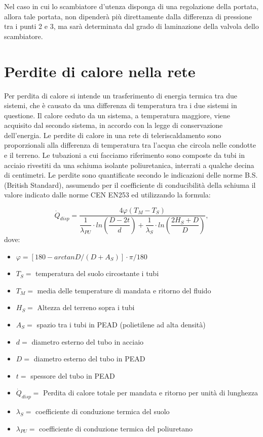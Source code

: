 \documentclass[laurea,oneside,11pt]{USiena_tesiLM3}
\begin{document}
Nel caso in cui lo scambiatore d'utenza disponga di una regolazione della portata, allora tale portata, non dipenderà più direttamente dalla differenza di pressione tra i punti 2 e 3, ma sarà determinata dal grado di laminazione della valvola dello scambiatore. 

\section{Perdite di calore nella rete}
Per perdita di calore si intende un trasferimento di 
energia termica tra due sistemi, che è causato da una differenza di temperatura tra i due sistemi in questione. Il calore ceduto da un sistema, a temperatura maggiore, viene acquisito dal secondo sistema, in accordo con la legge di conservazione dell'energia. 
Le perdite di calore in una rete di teleriscaldamento sono proporzionali alla differenza di temperatura tra l'acqua che circola nelle condotte e il terreno. Le tubazioni a cui facciamo riferimento sono composte da tubi in acciaio rivestiti da una schiuma isolante poliuretanica, interrati a qualche decina di centimetri.
Le perdite sono quantificate secondo le indicazioni delle norme B.S. (British Standard), assumendo per il coefficiente di conducibilità della schiuma il valore indicato dalle norme CEN EN253 ed utilizzando la formula:

\begin{equation}
\dot{Q}_{disp} = \dfrac{4 \varphi (T_M - T_S)}{\dfrac{1}{\lambda_{PU}} \cdot ln \left(  \dfrac{D - 2t}{d}\right)  + \dfrac{1}{\lambda_S} \cdot ln \left(  \dfrac{2H_S + D}{D}\right) } ,
\end{equation}
dove:
\begin{itemize}
\item[] $\varphi = \left[ 180 - arctan  D /( D + A_S)  \right] \cdot \pi/180 $  
\item[] $T_S =$ temperatura del suolo circostante i tubi
\item[] $T_M =$ media delle temperature di mandata e ritorno del fluido
\item[] $H_S =$ Altezza del terreno sopra i tubi
\item[] $A_S =$ spazio tra i tubi in PEAD (polietilene ad alta densità)
\item[] $d =$ diametro esterno del tubo in acciaio
\item[] $D =$ diametro esterno del tubo in PEAD
\item[] $t =$ spessore del tubo in PEAD
\item[] $\dot{Q}_{disp} =$ Perdita di calore totale per mandata e ritorno per unità di lunghezza
\item[] $\lambda_S =$ coefficiente di conduzione termica del suolo
\item[] $\lambda_{PU} =$ coefficiente di conduzione termica del poliuretano
\end{itemize}
\end{document}
